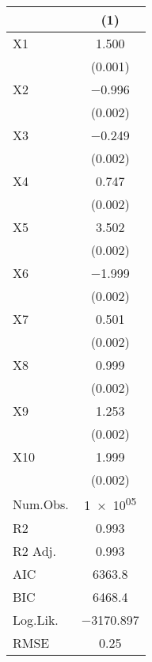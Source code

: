 \documentclass{article}
\begin{document}
 
\begin{table}
\centering
\begin{tabular}[h]{lc}
\toprule
  & (1)\\
\midrule
X1 & \num{1.500}\\
 & (\num{0.001})\\
X2 & \num{-0.996}\\
 & \vphantom{8} (\num{0.002})\\
X3 & \num{-0.249}\\
 & \vphantom{7} (\num{0.002})\\
X4 & \num{0.747}\\
 & \vphantom{6} (\num{0.002})\\
X5 & \num{3.502}\\
 & \vphantom{5} (\num{0.002})\\
X6 & \num{-1.999}\\
 & \vphantom{4} (\num{0.002})\\
X7 & \num{0.501}\\
 & \vphantom{3} (\num{0.002})\\
X8 & \num{0.999}\\
 & \vphantom{2} (\num{0.002})\\
X9 & \num{1.253}\\
 & \vphantom{1} (\num{0.002})\\
X10 & \num{1.999}\\
 & (\num{0.002})\\
\midrule
Num.Obs. & \num{1e+05}\\
R2 & \num{0.993}\\
R2 Adj. & \num{0.993}\\
AIC & \num{6363.8}\\
BIC & \num{6468.4}\\
Log.Lik. & \num{-3170.897}\\
RMSE & \num{0.25}\\
\bottomrule
\end{tabular}
\end{table}
\end{document}
